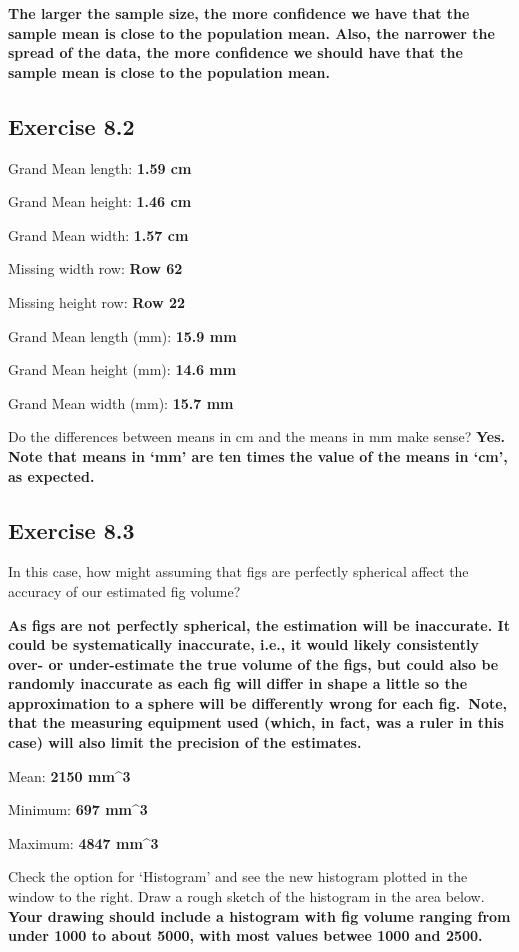 \documentclass[
  openany]{krantz}
\begin{document}
\textbf{The larger the sample size, the more confidence we have that the sample mean is close to the population mean. Also, the narrower the spread of the data, the more confidence we should have that the sample mean is close to the population mean.}

\hypertarget{exercise-8.2}{%
\subsection{Exercise 8.2}\label{exercise-8.2}}

Grand Mean length: \textbf{1.59 cm}

Grand Mean height: \textbf{1.46 cm}

Grand Mean width: \textbf{1.57 cm}

Missing width row: \textbf{Row 62}

Missing height row: \textbf{Row 22}

Grand Mean length (mm): \textbf{15.9 mm}

Grand Mean height (mm): \textbf{14.6 mm}

Grand Mean width (mm): \textbf{15.7 mm}

Do the differences between means in cm and the means in mm make sense? \textbf{Yes. Note that means in `mm' are ten times the value of the means in `cm', as expected.}

\hypertarget{exercise-8.3}{%
\subsection{Exercise 8.3}\label{exercise-8.3}}

In this case, how might assuming that figs are perfectly spherical affect the accuracy of our estimated fig volume?

\textbf{As figs are not perfectly spherical, the estimation will be inaccurate. It could be systematically inaccurate, i.e., it would likely consistently over- or under-estimate the true volume of the figs, but could also be randomly inaccurate as each fig will differ in shape a little so the approximation to a sphere will be differently wrong for each fig.~Note, that the measuring equipment used (which, in fact, was a ruler in this case) will also limit the precision of the estimates.}

Mean: \textbf{2150 mm\^{}3}

Minimum: \textbf{697 mm\^{}3}

Maximum: \textbf{4847 mm\^{}3}

Check the option for `Histogram' and see the new histogram plotted in the window to the
right. Draw a rough sketch of the histogram in the area below. \textbf{Your drawing should include a histogram with fig volume ranging from under 1000 to about 5000, with most values betwee 1000 and 2500.}
\end{document}
